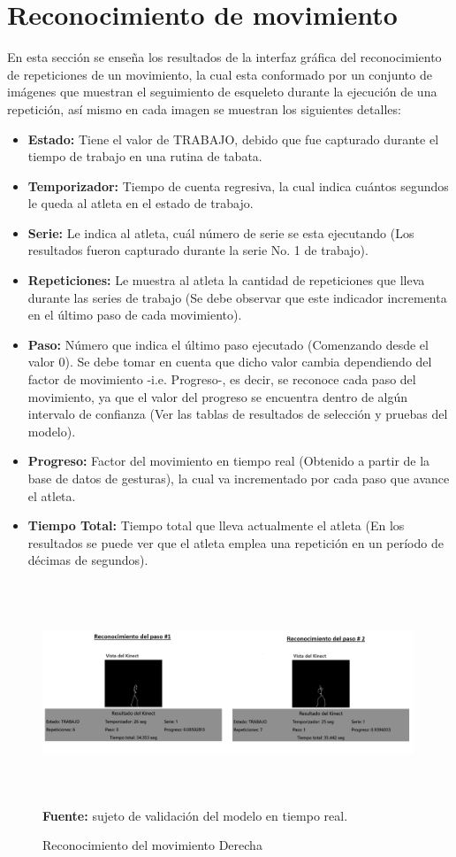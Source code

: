 \section{Reconocimiento de movimiento}
En esta secci\'on se ense\~na los resultados de la interfaz gr\'afica del reconocimiento de repeticiones de un movimiento, la cual esta conformado por un conjunto de im\'agenes que muestran el seguimiento de esqueleto durante la ejecuci\'on de una repetici\'on, as\'i mismo en cada imagen se muestran los siguientes detalles:
\begin{itemize}
\item \textbf{Estado:} Tiene el valor de TRABAJO, debido que fue capturado durante el tiempo de trabajo en una rutina de tabata.
\item \textbf{Temporizador:} Tiempo de cuenta regresiva, la cual indica cu\'antos segundos le queda al atleta en el estado de trabajo.
\item \textbf{Serie:} Le indica al atleta, cu\'al n\'umero de serie se esta ejecutando (Los resultados fueron capturado durante la serie No. 1 de trabajo).
\item \textbf{Repeticiones:} Le muestra al atleta la cantidad de repeticiones que lleva durante las  series de trabajo (Se debe observar que este indicador incrementa en el \'ultimo paso de cada movimiento).
\item \textbf{Paso:} N\'umero que indica el \'ultimo paso ejecutado (Comenzando desde el valor 0). Se debe tomar en cuenta que dicho valor cambia dependiendo del factor de movimiento -i.e. Progreso-, es decir, se  reconoce cada paso del movimiento, ya que el valor del progreso se encuentra dentro de alg\'un intervalo de confianza (Ver las tablas de resultados de selecci\'on y pruebas del modelo).
\item \textbf{Progreso:} Factor del movimiento en tiempo real (Obtenido a partir de la base de datos de gesturas), la cual va incrementado por cada paso que avance el atleta.
\item \textbf{Tiempo Total:} Tiempo total que lleva actualmente el atleta (En los resultados se puede ver que el atleta emplea una repetici\'on en un per\'iodo de d\'ecimas de segundos).
\end{itemize}
\begin{figure}[H]
	\caption{Reconocimiento del movimiento Derecha}
	\label{fig:recognitionTenis}
	\centering
	\includegraphics[width=420px,height=250px]{graphics/resultados/recognitionTennis.png} \\
	\textbf{Fuente:} sujeto de validaci\'on del modelo en tiempo real.
\end{figure}
